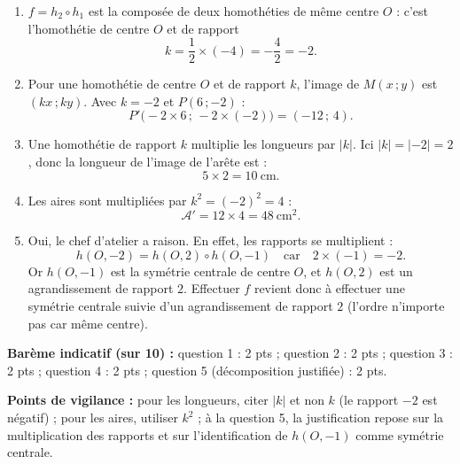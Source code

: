 \documentclass[11pt]{article}
\newcommand{\cle}[1]{{\popxbold\color{popdark}#1}}
\begin{document}
\begin{corrige}
\begin{enumerate}
\item $f=h_2\circ h_1$ est la composée de deux homothéties de même centre $O$ : c'est l'homothétie de centre $O$ et de rapport
\[ k=\dfrac{1}{2}\times(-4)=-\dfrac{4}{2}=-2. \]
\item Pour une homothétie de centre $O$ et de rapport $k$, l'image de $M(x\,;y)$ est $(kx\,;ky)$. Avec $k=-2$ et $P(6\,;-2)$ :
\[ P'\big(-2\times 6\,;\,-2\times(-2)\big)=(-12\,;\,4). \]
\item Une homothétie de rapport $k$ multiplie les longueurs par $|k|$. Ici $|k|=|-2|=2$, donc la longueur de l'image de l'arête est :
\[ 5\times 2=10\ \mathrm{cm}. \]
\item Les aires sont multipliées par $k^2=(-2)^2=4$ :
\[ \mathcal{A}'=12\times 4=48\ \mathrm{cm}^2. \]
\item Oui, le chef d'atelier a raison. En effet, les rapports se multiplient :
\[ h(O,-2)=h(O,2)\circ h(O,-1) \quad\text{car}\quad 2\times(-1)=-2. \]
Or $h(O,-1)$ est la \cle{symétrie centrale} de centre $O$, et $h(O,2)$ est un agrandissement de rapport $2$. Effectuer $f$ revient donc à effectuer une symétrie centrale suivie d'un agrandissement de rapport $2$ (l'ordre n'importe pas car même centre).
\end{enumerate}
\textbf{Barème indicatif (sur 10) :} question 1 : 2 pts ; question 2 : 2 pts ; question 3 : 2 pts ; question 4 : 2 pts ; question 5 (décomposition justifiée) : 2 pts.

\textbf{Points de vigilance :} pour les longueurs, citer $|k|$ et non $k$ (le rapport $-2$ est négatif) ; pour les aires, utiliser $k^2$ ; à la question 5, la justification repose sur la multiplication des rapports et sur l'identification de $h(O,-1)$ comme symétrie centrale.
\end{corrige}
\end{document}
